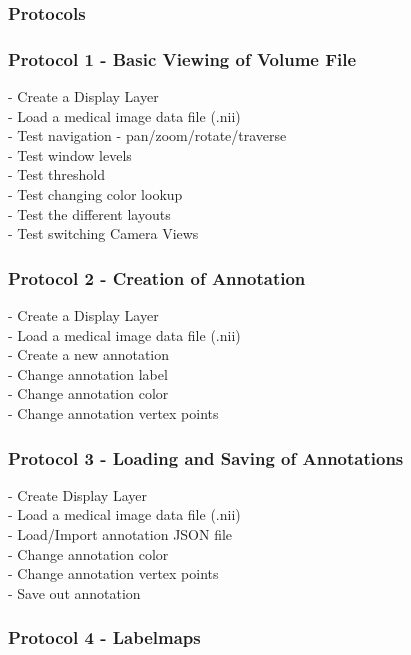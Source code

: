 \documentclass[a4paper,11pt,titlepage]{article}
\begin{document}
\subsubsection{Protocols}

\subsubsection*{Protocol 1 - Basic Viewing of Volume File }

- Create a Display Layer\\
- Load a medical image data file (.nii)\\
- Test navigation - pan/zoom/rotate/traverse\\
- Test window levels\\
- Test threshold\\
- Test changing color lookup\\
- Test the different layouts\\
- Test switching Camera Views

\subsubsection*{Protocol 2 - Creation of Annotation }

- Create a Display Layer\\
- Load a medical image data file (.nii)\\
- Create a new annotation\\
- Change annotation label\\
- Change annotation color\\
- Change annotation vertex points

\subsubsection*{Protocol 3 - Loading and Saving of Annotations }

- Create Display Layer\\
- Load a medical image data file (.nii)\\
- Load/Import annotation JSON file\\
- Change annotation color\\
- Change annotation vertex points\\
- Save out annotation


\subsubsection*{Protocol 4 - Labelmaps }
\end{document}
